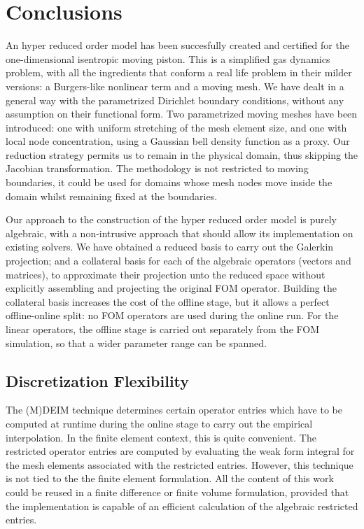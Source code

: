 \documentclass[thesis.tex]{subfiles}
\begin{document}
\section{Conclusions}
An hyper reduced order model has been succesfully created and certified for
the one-dimensional isentropic moving piston.
This is a simplified gas dynamics problem, 
with all the ingredients that conform a real life problem in their milder versions:
a Burgers-like nonlinear term and a moving mesh.
We have dealt in a general way with the parametrized Dirichlet boundary conditions,
without any assumption on their functional form.
Two parametrized moving meshes have been introduced: 
one with uniform stretching of the mesh element size,
and one with local node concentration, using a Gaussian bell density function as a proxy.
Our reduction strategy permits us to remain in the physical domain, 
thus skipping the Jacobian transformation.
The methodology is not restricted to moving boundaries, 
it could be used for domains whose mesh nodes move inside the domain 
whilst remaining fixed at the boundaries.

Our approach to the construction of the hyper reduced order model is purely algebraic, 
with a non-intrusive approach that should allow its implementation on existing solvers.
We have obtained a reduced basis to carry out the Galerkin projection;
and a collateral basis for each of the algebraic operators (vectors and matrices),
to approximate their projection unto the reduced space 
without explicitly assembling and projecting the original FOM operator.
Building the collateral basis increases the cost of the offline stage,
but it allows a perfect offline-online split:
no FOM operators are used during the online run. 
For the linear operators, the offline stage is carried out separately from the FOM simulation,
so that a wider parameter range can be spanned. 


\subsection{Discretization Flexibility}
The (M)DEIM technique determines certain operator entries which 
have to be computed at runtime during the online stage 
to carry out the empirical interpolation.
In the finite element context, this is quite convenient.
The restricted operator entries are computed by evaluating the weak form integral
for the mesh elements associated with the restricted entries. 
However, this technique is not tied to the the finite element formulation.
All the content of this work could be reused in a finite difference or finite volume formulation,
provided that the implementation is capable of an efficient calculation of the algebraic restricted entries.
\end{document}
